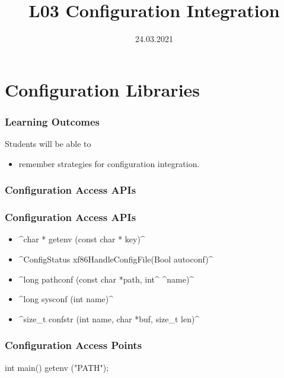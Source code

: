 

\title{L03 Configuration Integration}
\date{24.03.2021}



\section{Configuration Libraries}


\begin{frame}
	\frametitle{Learning Outcomes}
	Students will be able to
	\begin{itemize}
	\item remember strategies for configuration integration.
	\end{itemize}
\end{frame}

\begin{frame}
	\frametitle{Configuration Access APIs}

	\Large

\end{frame}

\begin{frame}[fragile]
	\frametitle{Configuration Access APIs}

	\begin{itemize}[<+-| alert@+>]
	\item ^char * getenv (const char * key)^
	\item ^ConfigStatus xf86HandleConfigFile(Bool autoconf)^
	\item ^long pathconf (const char *path, int^ ^name)^
	\item ^long sysconf (int name)^
	\item ^size_t confstr (int name, char *buf, size_t len)^
	\end{itemize}
\end{frame}

\begin{frame}[fragile]
	\frametitle{Configuration Access Points}

	\begin{code}[language=Cpp,gobble=4,showspaces=no]
	int main()
	{
		getenv ("PATH");
	}
	\end{code}
\end{frame}

